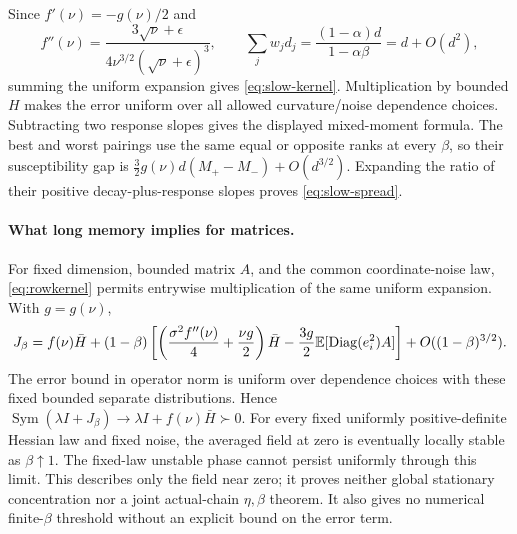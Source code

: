 Since $f'(\nu)=-g(\nu)/2$ and
\[
 f''(\nu)=\frac{3\sqrt\nu+\epsilon}
                {4\nu^{3/2}(\sqrt\nu+\epsilon)^3},\qquad
 \sum_jw_jd_j=\frac{(1-\alpha)d}{1-\alpha\beta}=d+O(d^2),
\]
summing the uniform expansion gives \eqref{eq:slow-kernel}.
Multiplication by bounded $H$ makes the error uniform over all allowed
curvature/noise dependence choices. Subtracting two response slopes gives
the displayed mixed-moment formula. The best and worst pairings use the
same equal or opposite ranks at every $\beta$, so their susceptibility gap is
$\tfrac32g(\nu)d(M_+-M_-)+O(d^{3/2})$. Expanding the ratio of their
positive decay-plus-response slopes proves \eqref{eq:slow-spread}.

\paragraph{What long memory implies for matrices.}
For fixed dimension, bounded matrix $A$, and the common coordinate-noise
law, \eqref{eq:rowkernel} permits entrywise multiplication of the same
uniform expansion. With $g=g(\nu)$,
\begin{equation}\label{eq:matrix-slow-expansion}
 J_\beta=f(\nu)\bar H+(1-\beta)
 \left[\left(\frac{\sigma^2f''(\nu)}4+\frac{\nu g}2\right)\bar H
       -\frac{3g}2\mathbb E[\operatorname{Diag}(e_i^2)A]\right]
 +O((1-\beta)^{3/2}).
\end{equation}
The error bound in operator norm is uniform over dependence choices
with these fixed bounded separate distributions. Hence
$\operatorname{Sym}(\lambda I+J_\beta)\to\lambda I+f(\nu)\bar H\succ0$.
For every fixed uniformly positive-definite Hessian law and fixed noise,
the averaged field at zero is eventually locally stable as $\beta\uparrow1$.
The fixed-law unstable phase cannot persist uniformly through this limit.
This describes only the field near zero; it proves neither global
stationary concentration nor a joint actual-chain $\eta,\beta$ theorem.
It also gives no numerical
finite-$\beta$ threshold without an explicit bound on the error term.

